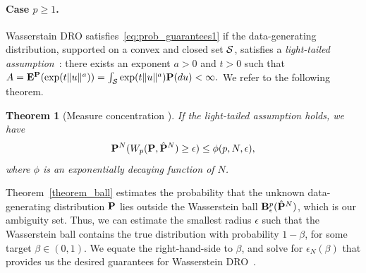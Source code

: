 \documentclass[12pt]{article}
\newcommand{\citep}{\cite}
\theoremstyle{thmstyleone}%
\newtheorem{theorem}{Theorem}%
\theoremstyle{thmstyletwo}%
\theoremstyle{thmstylethree}%
\newcommand{\reviewChanges}{}
\begin{document}
\paragraph{Case $p \geq 1$.} Wasserstain \gls{DRO} satisfies~\eqref{eq:prob_guarantees1} if the data-generating distribution, supported on a convex and closed set $\mathcal{S}$, satisfies a {\it light-tailed assumption}~\citep{fournier_guillin_2013,mohajerin_esfahani_data-driven_2018}: there exists an exponent $a > 0$ and $t > 0 $ such that ${A = \Expect^{\prob}(\exp (t \|u \|^a))  = \int_{\reviewChanges{\supp}} \exp (t \| u \| ^a) \prob(du) < \infty.}$
We refer to the following theorem.
\begin{theorem}[Measure concentration {\citep[Theorem 2]{fournier_guillin_2013}}]
\label{theorem_ball}
If the light-tailed assumption holds, we have
	\begin{equation*}
	{\mathbf P}^N(W_p({\mathbf P},\hat{{\mathbf P}}^N) \geq \epsilon) \le \phi(p, N, \epsilon),
	\end{equation*}
where $\phi$ is an exponentially decaying function of $N$.
\end{theorem}
Theorem~\eqref{theorem_ball} estimates the probability that the unknown data-generating distribution ${\mathbf P}$ lies outside the Wasserstein ball $\mathbf{B}_\epsilon^p (\hat{{\mathbf P}}^N)$, which is our ambiguity set.
Thus, we can estimate the smallest radius $\epsilon$ such that the Wasserstein ball contains the true distribution with probability $1 - \beta$, for some target $\beta \in (0,1)$.
We equate the right-hand-side to $\beta$, and solve for $\epsilon_N(\beta)$ that provides us the desired guarantees for Wasserstein \gls{DRO}~\citep[Theorem 3.5]{mohajerin_esfahani_data-driven_2018}.
\end{document}
